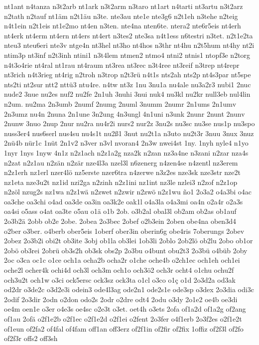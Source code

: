 {nt1ant
n4tanza
n3t2arb
nt1ark
n3t2arm
n3taro
nt1art
n4tarti
nt3artu
n3t2arz
n2tath
n2tauf
nt1äm
n2t1äu
n3te.
nte3au
nte1e
nte3g6
n2t1eh
n3tehe
n2teig
n4t1ein
n2t1eis
nt1e2mo
nt4en
n3ten.
nte4na
nten6te.
ntera2
nte6r5eis
nt4erh
nt4erk
nt4erm
nt4ern
nt4ers
nt4ert
n3tes2
nte3sa
n4t1ess
n6testri
n3tet.
n2t1e2ta
nteu3
nteu6eri
nte3v
ntge4n
nt3hel
nt3ho
nt4hos
n3thr
nt4hu
n2t5hum
nt4hy
nt2i
ntim3p
nt3inf
n2t3inh
ntini1
n3t4lem
ntmen2
ntmo4
ntni2
ntnis1
ntopf3e
n2torg
n4t3o4rie
nt4ral
nt1rau
nt4raum
nt3rea
nt3rec
n3t4ree
nt3reif
n3trep
nt4repr
nt3rich
n4t3rieg
nt4rig
n2troh
n3trop
n2t3rü
n4t1s
nts2ah
nts2p
nt4s3par
nt5spe
nts2ti
nt2sur
ntt2
nttü3
ntu4re.
n4tw
nt3z
1nu
3nu1a
nu4ale
nu3a2r3
nubi1
2nuc
nude2
3nue
nu2es
nuf2
nu2fe
2n1uh
3nuhi
3nui
nuk4
nu3kl
nu2kr
null3eb
nul4lin
n2um.
nu2ma
2n3umb
2numf
2numg
2numl
3numm
2numr
2n1ums
2n1umv
2n3umz
nu4n
2nuna
2n1une
3n2ung
4n3ungl
4n1uni
n3unk
2nunr
2nunt
2nunv
2nunw
3nuo
2nup
2nur
nu2ra
nu4r2i
nurs2
nur2z
3nu2s
nu3sc
nu3se
nus1p
nu3spo
nuss3er4
nus6serl
nus4su
nu4s1t
nu2ß1
3nut
nu2t1a
n3uto
nu2t3r
3nuu
3nux
3nuz
2nü4b
nür1c
1nüt
2n1v2
n3ver
n3vl
nvoran4
2n3w
nwei4st
1ny.
1nyh
nyle4
n1yo
1nyr
1nys
1nyw
4n1z
n2z1ach
n2z1a2g
nza2k
n2zan
nz3a4ne
n3zani
n2zar
nza4s
n2zat
n2z1au
n2zän
n2zär
nze4l3a
nzel3l
n6zenerg
n4zen4se
n4zentl
nz3erem
n2z1erh
nz1erl
nzer4lö
nz5erste
nzer6tra
n4zerwe
n3z2es
nze3sk
nze3str
nze2t
nz1eta
nze3u2t
nz1id
nzi2ga
n2zinh
n2z1ini
nz1int
nz3le
nzlei3
n2zof
n2z1op
n2zöl
nzug2s
nz1wa
n2z1wä
n2zwet
n2zwir
n2zwö
n2z1wu
ño1
2o3a2
o4a3bi
o4ac
oa3che
oa3chi
o4ad
oa3de
oa3in
oa3k2e
oak1l
o4a3la
o4a3mi
oa4n
o2a4r
o2a3s
oa4si
o5ass
o4at
oa3te
o5au
o1ä
o1b
2ob.
o3b2al
obal3l
ob2am
ob2as
ob1auf
2o3b2ä
2obb
ob2e
2obe.
2obea
2o3bec
2obef
o2b3ein
2oben
obe4na
oben3d4
o2ber
o3ber.
o4berb
ober5eis
1oberf
ober3in
oberin6g
obe4ris
7oberungs
2obev
2obez
2o3b2i
obi2t
ob3ite
3obj
ob1la
ob3lei
1ob3li
2oblo
2ob2lö
ob2lu
2obo
ob1or
2obö
ob3rei
2obrü
ob3s2h
ob3sk
obs2p
2o3bu
o4bunt
obu2t3
2o3bü
o4büb
2oby
2oc
o3ca
oc1c
o1ce
och1a
ocha2b
ocha2r
o1che
oche4b
o2ch1ec
och1eh
och1ei
oche2l
ocher4k
ochi4d
och3l
och3m
och1o
och3ö2
och3r
ocht4
o1chu
ochu2f
och3u2t
och1w
o3ci
ock5ersc
ock3sz
ock3ta
o1cl
o3co
o1ç
o1d
2o3d2a
od3ak
od2dr
o3de2c
o3d2e3i
odein3
ode4l3ag
ode2n1
ode2s1e
ode3sp
o3dex
2o3dia
odi3c
2odif
2o3dir
2odn
o2don
odo2s
2odr
o2dre
odt4
2odu
o3dy
2o1e2
oe4b
oe3di
oe4m
oen1e
o3er
o4e3s
oe4sc
o2e3t
o3et.
oet4h
o3ets
2ofa
of1a2d
of1a2g
of2ang
of1au
2ofä
o2f1e2b
o2f1ec
o2f1e2d
o2f1ei
o2fent
2o3fer
o4f1erb
2o3f2es
o2f1e2t
of1eun
of2fa2
of4fal
of4fam
off1an
off3erz
of2f1in
of2fir
of2fix
1offiz
of2f3l
of2fo
of2f3r
offs2
off3sh
}
